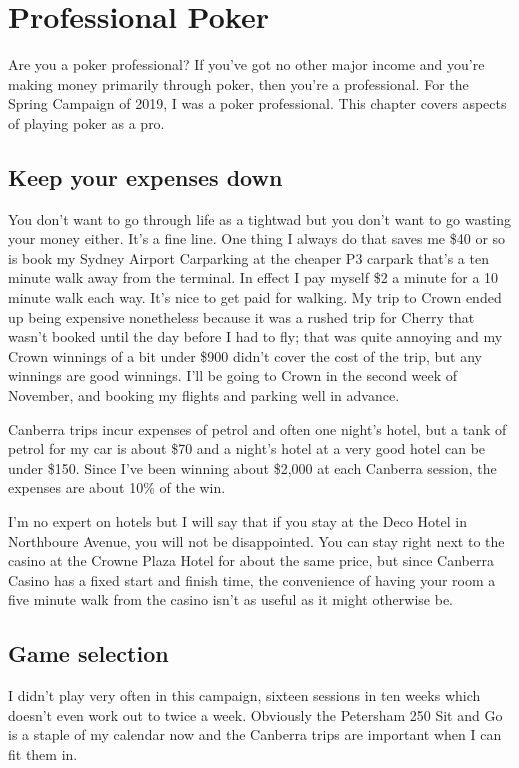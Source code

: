 \chapter{Professional Poker}

Are you a poker professional? If you've got no other major income and
you're making money primarily through poker, then you're a
professional. For the Spring Campaign of 2019, I was a poker
professional. This chapter covers aspects of playing poker as a pro.

\section*{Keep your expenses down}

You don't want to go through life as a tightwad but you don't want to
go wasting your money either. It's a fine line. One thing I always do
that saves me \$40 or so is book my Sydney Airport Carparking at the
cheaper P3 carpark that's a ten minute walk away from the
terminal. In effect I pay myself \$2 a minute for a 10 minute walk
each way. It's nice to get paid for walking. My trip to Crown ended up
being expensive nonetheless because it was a rushed trip for Cherry
that wasn't booked until the day before I had to fly; that was quite
annoying and my Crown winnings of a bit under \$900 didn't cover the
cost of the trip, but any winnings are good winnings. I'll be going to
Crown in the second week of November, and booking my flights and
parking well in advance.

Canberra trips incur expenses of petrol and often one night's hotel,
but a tank of petrol for my car is about \$70 and a night's hotel at
a very good hotel can be under \$150. Since I've been winning about
\$2,000 at each Canberra session, the expenses are about 10\% of
the win.

I'm no expert on hotels but I will say that if you stay at the Deco
Hotel in Northboure Avenue, you will not be disappointed. You can stay
right next to the casino at the Crowne Plaza Hotel for about the same
price, but since Canberra Casino has a fixed start and finish time,
the convenience of having your room a five minute walk from the casino
isn't as useful as it might otherwise be.

\section*{Game selection}

I didn't play very often in this campaign, sixteen sessions in ten
weeks which doesn't even work out to twice a week. Obviously the
Petersham 250 Sit and Go is a staple of my calendar now and the
Canberra trips are important when I can fit them in.

